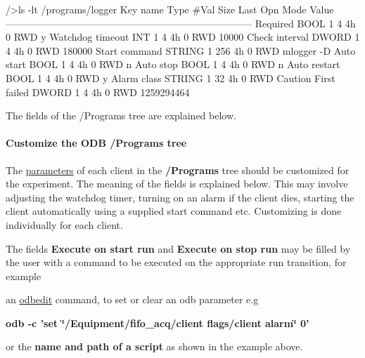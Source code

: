 \begin{DoxyCode}
/>ls -lt /programs/logger
Key name                        Type    #Val  Size  Last Opn Mode Value
---------------------------------------------------------------------------
Required                        BOOL    1     4     4h   0   RWD  y
Watchdog timeout                INT     1     4     4h   0   RWD  10000
Check interval                  DWORD   1     4     4h   0   RWD  180000
Start command                   STRING  1     256   4h   0   RWD  mlogger -D
Auto start                      BOOL    1     4     4h   0   RWD  n
Auto stop                       BOOL    1     4     4h   0   RWD  n
Auto restart                    BOOL    1     4     4h   0   RWD  y
Alarm class                     STRING  1     32    4h   0   RWD  Caution
First failed                    DWORD   1     4     4h   0   RWD  1259294464
\end{DoxyCode}


The fields of the /Programs tree are explained below.\hypertarget{RC_customize_ODB_RC_customize_Programs_tree}{}\paragraph{Customize the ODB /Programs tree}\label{RC_customize_ODB_RC_customize_Programs_tree}
The \hyperlink{structparameters}{parameters} of each client in the {\bfseries /Programs} tree should be customized for the experiment. The meaning of the fields is explained below. This may involve adjusting the watchdog timer, turning on an alarm if the client dies, starting the client automatically using a supplied start command etc. Customizing is done individually for each client.

The fields {\bfseries Execute on start run} and {\bfseries Execute on stop run} may be filled by the user with a command to be executed on the appropriate run transition, for example
\begin{DoxyItemize}
\item an \hyperlink{RC_odbedit_utility}{odbedit} command, to set or clear an odb parameter e.g \par
 {\bfseries  odb -\/c 'set \char`\"{}/Equipment/fifo\_\-acq/client flags/client alarm\char`\"{} 0' }
\item or the {\bfseries  name and path of a script} as shown in the example above.
\end{DoxyItemize}

